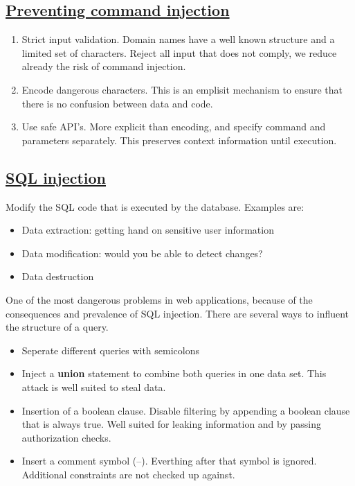 \documentclass[titlepage]{article}
\begin{document}
    \subsection{\href{https://youtu.be/NHeB4kh2hqg}{Preventing command injection}}
    \begin{enumerate}
        \item Strict input validation. Domain names have a well known structure and a limited set of characters. Reject all input that does not comply, we reduce already the risk of command injection.
        \item Encode dangerous characters. This is an emplisit mechanism to ensure that there is no confusion between data and code.
        \item Use safe API's. More explicit than encoding, and specify command and parameters separately. This preserves context information until execution.
    \end{enumerate}
    \subsection{\href{https://youtu.be/pcBwHO7gNEg}{SQL injection}}
    Modify the SQL code that is executed by the database. Examples are:
    \begin{itemize}
        \item Data extraction: getting hand on sensitive user information
        \item Data modification: would you be able to detect changes?
        \item Data destruction
    \end{itemize}
    One of the most dangerous problems in web applications, because of the consequences and prevalence of SQL injection. There are several ways to influent the structure of a query.
    \begin{itemize}
        \item Seperate different queries with semicolons
        \item Inject a \textbf{union} statement to combine both queries in one data set. This attack is well suited to steal data.
        \item Insertion of a boolean clause. Disable filtering by appending a boolean clause that is always true. Well suited for leaking information and by passing authorization checks.
        \item Insert a comment symbol (--). Everthing after that symbol is ignored. Additional constraints are not checked up against.
    \end{itemize}
\end{document}
